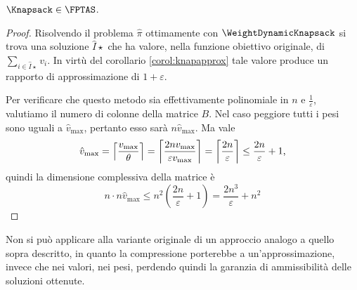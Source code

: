 \begin{theorem}
	$\Knapsack\in\FPTAS$.
\end{theorem}
\begin{proof}
	Risolvendo il problema $\hat\pi$ ottimamente con $\WeightDynamicKnapsack$ si trova una soluzione $\hat I\star$ che ha valore, nella funzione obiettivo originale, di $\sum_{i\in\hat I\star} v_i$. In virtù del corollario \ref{corol:knapapprox} tale valore produce un rapporto di approssimazione di $1+\varepsilon$.

	Per verificare che questo metodo sia effettivamente polinomiale in $n$ e $\frac{1}{\varepsilon}$, valutiamo il numero di colonne della matrice $B$.
	Nel caso peggiore tutti i pesi sono uguali a $\hat v_{\max}$, pertanto esso sarà $n \hat v_{\max}$.
	Ma vale
	\begin{equation*}
		\hat v_{\max}=\left\lceil \frac{v_{\max}}{\theta} \right\rceil=\left\lceil \frac{2nv_{\max}}{\varepsilon v_{\max}} \right\rceil=\left\lceil \frac{2n}{\varepsilon} \right\rceil\leq\frac{2n}{\varepsilon}+1 \text,
	\end{equation*}
	quindi la dimensione complessiva della matrice è
	\begin{equation*}
		n\cdot n\hat v_{\max}\leq n^2\left(\frac{2n}{\varepsilon}+1\right)=\frac{2n^3}{\varepsilon}+n^2
	\end{equation*}
\end{proof}

Non si può applicare alla variante originale di \DynamicKnapsack un approccio analogo a quello sopra descritto, in quanto la compressione porterebbe a un'approssimazione, invece che nei valori, nei pesi, perdendo quindi la garanzia di ammissibilità delle soluzioni ottenute.
